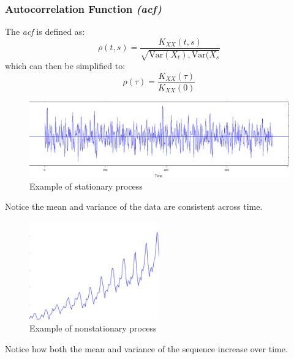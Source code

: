 \documentclass{article}
\begin{document}
\subsubsection{Autocorrelation Function \emph{(acf)}}
The \emph{acf} is defined as:
\begin{equation}\label{acf}
    \rho(t, s) = \frac{K_{XX}(t, s)}{\sqrt{\text{Var}(X_t), \text{Var}(X_s}}\nonumber
\end{equation}
which can then be simplified to:
\begin{equation}\label{acf}
    \rho(\tau) = \frac{K_{XX}(\tau)}{K_{XX}(0)}
\end{equation}
\begin{figure}[H]
    \centering
    \includegraphics[width=\textwidth]{Stationary.png}
    \caption{Example of stationary process}
    \label{stationary}
\end{figure}
Notice the mean and variance of the data are consistent across time.
\begin{figure}[H]
    \centering
    \includegraphics[width=0.5\textwidth]{nonstationary.png}
    \caption{Example of nonstationary process}
    \label{nonstatinoary}
\end{figure}
Notice how both the mean and variance of the sequence increase over time.
\end{document}
